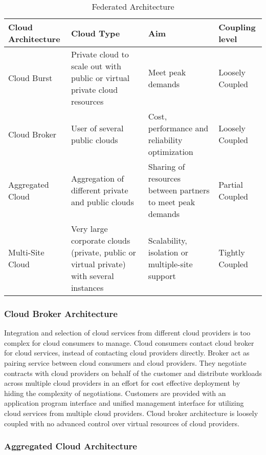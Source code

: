 \documentclass[conference]{IEEEtran}
\begin{document}
\begin{table*}[!t]
\renewcommand{\arraystretch}{1.3}
\caption{Federated Architecture}
\centering
\begin{tabular}{|p{2.5 cm}| p{5.5 cm}| p{5.5 cm} |p{2.5cm}|}
\hline
\bfseries Cloud Architecture &\bfseries  Cloud Type &\bfseries  Aim &\bfseries  Coupling level\\

\hline\hline

Cloud Burst & Private cloud to scale out with public or virtual private cloud resources & Meet peak demands & Loosely Coupled\\ 
\hline
Cloud Broker & User of several public clouds & Cost, performance and reliability optimization & Loosely Coupled\\ 
\hline
Aggregated Cloud & Aggregation of different private and public clouds & Sharing of resources between partners to meet peak demands & Partial Coupled\\ 
\hline
Multi-Site Cloud & Very large corporate clouds (private, public or virtual private) with several instances & Scalability, isolation or multiple-site support & Tightly Coupled\\ 

\hline
\end{tabular}
\end{table*}

\subsubsection{Cloud Broker Architecture}

Integration and selection of cloud services from different cloud providers is too complex for cloud consumers to manage. Cloud consumers contact cloud broker for cloud services, instead of contacting cloud providers directly. Broker act as pairing service between cloud consumers and cloud providers. They negotiate contracts with cloud providers on behalf of the customer and distribute workloads across multiple cloud providers in an effort for cost effective deployment by hiding the complexity of negotiations. Customers are provided with an application program interface and unified management interface for utilizing cloud services from multiple cloud providers. Cloud broker architecture is loosely coupled with no advanced control over virtual resources of cloud providers. 

\subsubsection{Aggregated Cloud Architecture}
\end{document}
